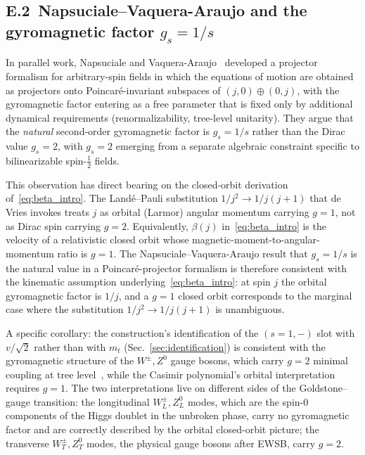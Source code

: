 \documentclass[twocolumn,aps,prd,floatfix,nofootinbib,superscriptaddress,10pt]{article}
\begin{document}
\subsection*{E.2\, Napsuciale--Vaquera-Araujo and the gyromagnetic factor $g_s=1/s$}

In parallel work, Napsuciale and Vaquera-Araujo~\cite{NV2003,VNA2012} developed a projector formalism for arbitrary-spin fields in which the equations of motion are obtained as projectors onto Poincar\'e-invariant subspaces of $(j,0)\oplus(0,j)$, with the gyromagnetic factor entering as a free parameter that is fixed only by additional dynamical requirements (renormalizability, tree-level unitarity). They argue that the {\em natural} second-order gyromagnetic factor is $g_s=1/s$ rather than the Dirac value $g_s=2$, with $g_s=2$ emerging from a separate algebraic constraint specific to bilinearizable spin-$\tfrac12$ fields.

This observation has direct bearing on the closed-orbit derivation of~\eqref{eq:beta_intro}. The Land\'e--Pauli substitution $1/j^2\to 1/j(j+1)$ that de Vries invokes treats $j$ as orbital (Larmor) angular momentum carrying $g=1$, not as Dirac spin carrying $g=2$. Equivalently, $\beta(j)$ in~\eqref{eq:beta_intro} is the velocity of a relativistic closed orbit whose magnetic-moment-to-angular-momentum ratio is $g=1$. The Napsuciale--Vaquera-Araujo result that $g_s=1/s$ is the natural value in a Poincar\'e-projector formalism is therefore consistent with the kinematic assumption underlying~\eqref{eq:beta_intro}: at spin $j$ the orbital gyromagnetic factor is $1/j$, and a $g=1$ closed orbit corresponds to the marginal case where the substitution $1/j^2\to 1/j(j+1)$ is unambiguous.

A specific corollary: the construction's identification of the $(s=1,-)$ slot with $v/\sqrt2$ rather than with $m_t$ (Sec.~\ref{sec:identification}) is consistent with the gyromagnetic structure of the $W^\pm,Z^0$ gauge bosons, which carry $g=2$ minimal coupling at tree level~\cite{Jackiw1971,DjukanovicSchindler2004}, while the Casimir polynomial's orbital interpretation requires $g=1$. The two interpretations live on different sides of the Goldstone--gauge transition: the longitudinal $W^\pm_L,Z^0_L$ modes, which are the spin-$0$ components of the Higgs doublet in the unbroken phase, carry no gyromagnetic factor and are correctly described by the orbital closed-orbit picture; the transverse $W^\pm_T,Z^0_T$ modes, the physical gauge bosons after EWSB, carry $g=2$.
\end{document}
